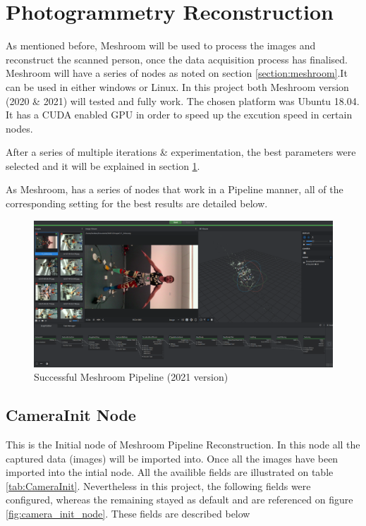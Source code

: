 \documentclass[12pt]{report}
\begin{document}
\section{Photogrammetry Reconstruction}
\label{section:meshroom_method}
As mentioned before, Meshroom will be used to process the images and reconstruct the scanned person, once the data acquisition process has finalised. 
Meshroom will have a series of nodes as noted on section \ref{section:meshroom}.It can be used in either windows or Linux. In this project both Meshroom version
(2020 \& 2021) will tested and fully work. The chosen platform was Ubuntu 18.04. It has a CUDA enabled GPU in order to speed up the excution speed in certain nodes.

After a series of multiple iterations \& experimentation, the best parameters were selected and it will be explained in section \ref{section:meshroom_method}.

As Meshroom, has a series of nodes that work in a Pipeline manner, all  of the corresponding setting for the best results are detailed below.

\begin{figure}[H]%
  \centering
 \includegraphics[width=1\textwidth]{meshroom_gui_reconstruction.png}
\caption{Successful Meshroom Pipeline (2021 version)}
\label{fig:final_meshroom} 
\end{figure}

\subsection*{CameraInit Node}
This is the Initial node of Meshroom Pipeline Reconstruction. 
In this node all the captured data (images) will be imported into.
Once all the images have been imported into the intial node.
All the availible fields are illustrated on table \ref{tab:CameraInit}. Nevertheless in this project, the following fields were configured, whereas the remaining stayed as default and are referenced on figure \ref{fig:camera_init_node}.
These fields are described below
\end{document}
